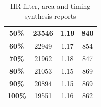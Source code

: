 \documentclass[a4paper]{article}
\begin{document}
\begin{table}[hbtp]
\begin{tabular}{|c|c|c|c|}
		\textbf{50\%}                                                                   & 		23546                                                                      & 		1.19                                                                       & 		840                                                                                  \\ \hline
		\textbf{60\%}                                                                   & 		22949                                                                      & 		1.17                                                                       & 		854                                                                                  \\ \hline
		\textbf{70\%}                                                                   & 		21962                                                                      & 		1.18                                                                       & 		847                                                                                  \\ \hline
		\textbf{80\%}                                                                   & 		21053                                                                      & 		1.15                                                                       & 		869                                                                                  \\ \hline
		\textbf{90\%}                                                                   & 		20894                                                                      & 		1.15                                                                       & 		869                                                                                  \\ \hline
		\textbf{100\%}                                                                  & 		19551                                                                      & 		1.16                                                                       & 		862                                                                                  \\ \hline
		\end{tabular}
		\caption{IIR filter, area and timing synthesis reports}
		\label{tab:iir_syn}
	\end{table}
\end{document}
